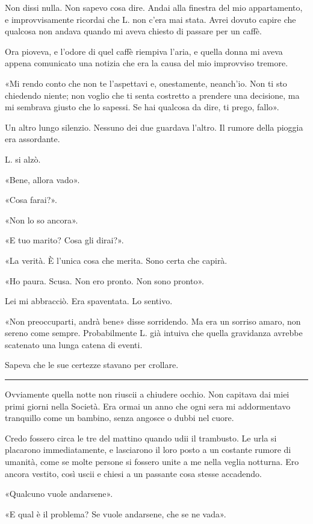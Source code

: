 \documentclass[a4paper,11pt,oneside,openright,final]{memoir}
\begin{document}
Non dissi nulla. Non sapevo cosa dire. Andai alla finestra del mio appartamento,
e improvvisamente ricordai che L. non c'era mai stata. Avrei dovuto capire che
qualcosa non andava quando mi aveva chiesto di passare per un caffè.

Ora pioveva, e l'odore di quel caffè riempiva l'aria, e quella donna mi aveva
appena comunicato una notizia che era la causa del mio improvviso tremore.

«Mi rendo conto che non te l'aspettavi e, onestamente, neanch'io. Non ti sto
chiedendo niente; non voglio che ti senta costretto a prendere una decisione,
ma mi sembrava giusto che lo sapessi. Se hai qualcosa da dire, ti prego, fallo».

Un altro lungo silenzio. Nessuno dei due guardava l'altro. Il rumore della
pioggia era assordante.

L. si alzò.

«Bene, allora vado».

«Cosa farai?».

«Non lo so ancora».

«E tuo marito? Cosa gli dirai?».

«La verità. È l'unica cosa che merita. Sono certa che capirà.

«Ho paura. Scusa. Non ero pronto. Non sono pronto».

Lei mi abbracciò. Era spaventata. Lo sentivo.

«Non preoccuparti, andrà bene» disse sorridendo. Ma era un sorriso amaro, non
sereno come sempre. Probabilmente L. già intuiva che quella gravidanza avrebbe
scatenato una lunga catena di eventi.

Sapeva che le sue certezze stavano per crollare.

\plainbreak{1}

Ovviamente quella notte non riuscii a chiudere occhio. Non capitava dai miei
primi giorni nella Società. Era ormai un anno che ogni sera mi addormentavo
tranquillo come un bambino, senza angosce o dubbi nel cuore.

Credo fossero circa le tre del mattino quando udii il trambusto. Le urla si
placarono immediatamente, e lasciarono il loro posto a un costante rumore di
umanità, come se molte persone si fossero unite a me nella veglia notturna. Ero
ancora vestito, così uscii e chiesi a un passante cosa stesse accadendo.

«Qualcuno vuole andarsene».

«E qual è il problema? Se vuole andarsene, che se ne vada».
\end{document}
